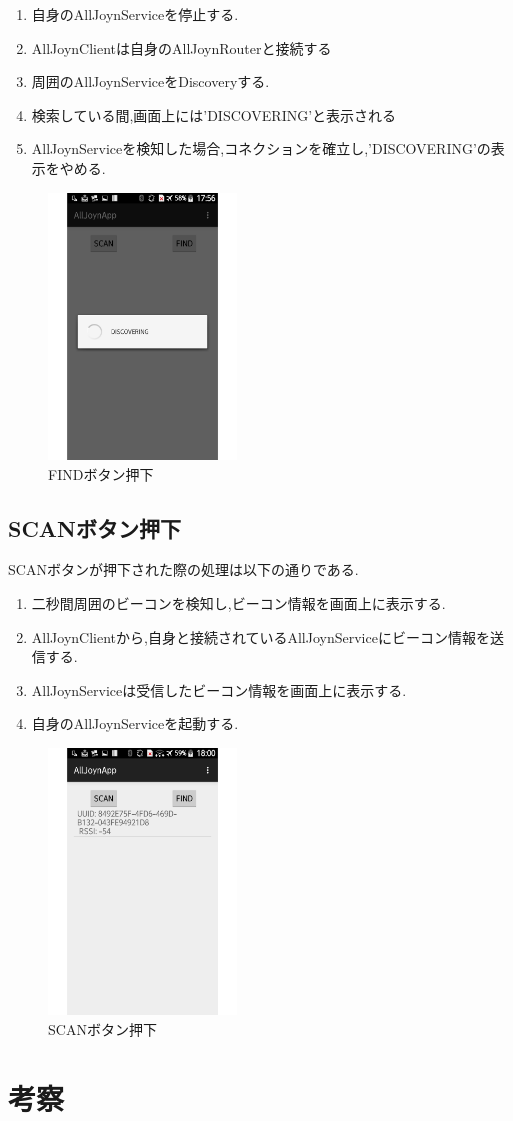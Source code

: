 \begin{enumerate}
\item 自身のAllJoynServiceを停止する.
\item AllJoynClientは自身のAllJoynRouterと接続する
\item 周囲のAllJoynServiceをDiscoveryする.
\item 検索している間,画面上には'DISCOVERING'と表示される
\item AllJoynServiceを検知した場合,コネクションを確立し,'DISCOVERING'の表示をやめる.
\end{enumerate}

\begin{figure}[htbp]
\centering
\includegraphics[width=5cm]{fig/screen2.pdf}
\caption{FINDボタン押下}
\end{figure}

\subsection{SCANボタン押下}
SCANボタンが押下された際の処理は以下の通りである.
\begin{enumerate}
\item 二秒間周囲のビーコンを検知し,ビーコン情報を画面上に表示する.
\item AllJoynClientから,自身と接続されているAllJoynServiceにビーコン情報を送信する.
\item AllJoynServiceは受信したビーコン情報を画面上に表示する.
\item 自身のAllJoynServiceを起動する.
\end{enumerate}

\begin{figure}[htbp]
\centering
\includegraphics[width=5cm]{fig/screen3.pdf}
\caption{SCANボタン押下}
\end{figure}


\section{考察}
